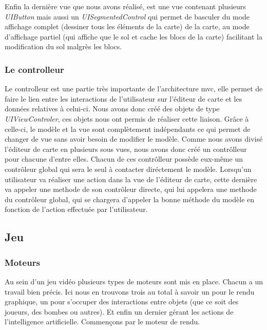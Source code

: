 		\begin{center}
		\end{center}
		Enfin la dernière vue que nous avons réalisé, est une vue contenant plusieurs \textit{UIButton} mais aussi un \textit{UISegmentedControl} qui permet de basculer du mode affichage complet (dessiner tous les éléments de la carte) de la carte, au mode d'affichage partiel (qui affiche que le sol et cache les blocs de la carte) facilitant la modification du sol malgrès les blocs.
			
			
	\subsubsection{Le controlleur}
		
		Le controlleur est une partie très importante de l'architecture \gls{mvc}, elle permet de faire le lien entre les interactions de l'utilisateur sur l'éditeur de carte et les données relatives à celui-ci. Nous avons  donc créé des objets de type \textit{UIViewControler}, ces objets nous ont permis de réaliser cette liaison. Grâce à celle-ci, le modèle et la vue sont complètement indépendants ce qui permet de changer de vue sans avoir besoin de modifier le modèle. Comme nous avons divisé l'éditeur de carte en plusieurs sous vues, nous avons donc créé un contrôlleur pour chacune d'entre elles. Chacun de ces contrôlleur possède eux-même un contrôleur global qui sera le seul à contacter diréctement le modèle. Lorsqu'un utilisateur va réaliser une action dans la vue de l'éditeur de carte, cette dernière va appeler une methode de son contrôleur directe, qui lui appelera une methode du contrôleur global, qui se chargera d'appeler la bonne méthode du modèle en fonction de l'action effectuée par l'utilisateur. 



\subsection{Jeu}

	\subsubsection{Moteurs}
	
		Au sein d'un jeu vidéo plusieurs types de moteurs sont mis en place.
		Chacun a un travail bien précis.
		Ici nous en trouvons trois au total à savoir un pour le rendu graphique, un
		pour s'occuper des interactions entre objets (que ce soit des joueurs, des bombes ou autres). Et enfin un dernier gérant
		les actions de l'intelligence artificielle.
		Commençons par le moteur de rendu.
	
